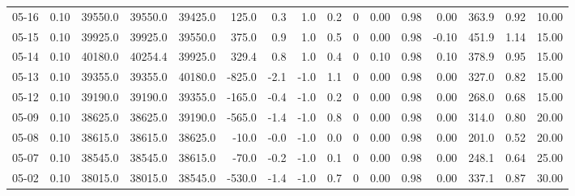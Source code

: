 \begin{threeparttable}
{\begin{tabular}{lrrrrrrrrrrrrrrr}
  05-16 &     0.10 & 39550.0 & 39550.0 & 39425.0 &      125.0 &            0.3 &                      1.0 &                 0.2 &              0 &       0.00 &      0.98 &           0.00 &            363.9 &            0.92 &                  10.00 \\
  05-15 &     0.10 & 39925.0 & 39925.0 & 39550.0 &      375.0 &            0.9 &                      1.0 &                 0.5 &              0 &       0.00 &      0.98 &          -0.10 &            451.9 &            1.14 &                  15.00 \\
  05-14 &     0.10 & 40180.0 & 40254.4 & 39925.0 &      329.4 &            0.8 &                      1.0 &                 0.4 &              0 &       0.10 &      0.98 &           0.10 &            378.9 &            0.95 &                  15.00 \\
  05-13 &     0.10 & 39355.0 & 39355.0 & 40180.0 &     -825.0 &           -2.1 &                     -1.0 &                 1.1 &              0 &       0.00 &      0.98 &           0.00 &            327.0 &            0.82 &                  15.00 \\
  05-12 &     0.10 & 39190.0 & 39190.0 & 39355.0 &     -165.0 &           -0.4 &                     -1.0 &                 0.2 &              0 &       0.00 &      0.98 &           0.00 &            268.0 &            0.68 &                  15.00 \\
  05-09 &     0.10 & 38625.0 & 38625.0 & 39190.0 &     -565.0 &           -1.4 &                     -1.0 &                 0.8 &              0 &       0.00 &      0.98 &           0.00 &            314.0 &            0.80 &                  20.00 \\
  05-08 &     0.10 & 38615.0 & 38615.0 & 38625.0 &      -10.0 &           -0.0 &                     -1.0 &                 0.0 &              0 &       0.00 &      0.98 &           0.00 &            201.0 &            0.52 &                  20.00 \\
  05-07 &     0.10 & 38545.0 & 38545.0 & 38615.0 &      -70.0 &           -0.2 &                     -1.0 &                 0.1 &              0 &       0.00 &      0.98 &           0.00 &            248.1 &            0.64 &                  25.00 \\
  05-02 &     0.10 & 38015.0 & 38015.0 & 38545.0 &     -530.0 &           -1.4 &                     -1.0 &                 0.7 &              0 &       0.00 &      0.98 &           0.00 &            337.1 &            0.87 &                  30.00 \\

\end{tabular}}
\end{threeparttable}
